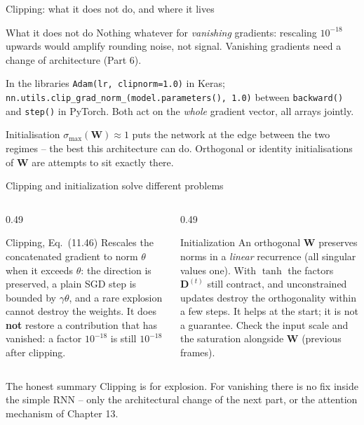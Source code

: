 \documentclass[10pt,aspectratio=169]{beamer}
\begin{document}
\begin{frame}{Clipping: what it does not do, and where it lives}
\begin{block}{What it does not do}
Nothing whatever for \emph{vanishing} gradients: rescaling $10^{-18}$
upwards would amplify rounding noise, not signal.  Vanishing gradients need
a change of architecture (Part 6).
\end{block}
\begin{block}{In the libraries}
\texttt{Adam(lr, clipnorm=1.0)} in Keras;
\texttt{nn.utils.clip\_grad\_norm\_(model.parameters(), 1.0)} between
\texttt{backward()} and \texttt{step()} in PyTorch.  Both act on the
\emph{whole} gradient vector, all arrays jointly.
\end{block}
\begin{block}{Initialisation}
$\sigma_{\max}(\bm{W})\approx1$ puts the network at the edge between the
two regimes -- the best this architecture can do.  Orthogonal or identity
initialisations of $\bm{W}$ are attempts to sit exactly there.
\end{block}
\end{frame}

\begin{frame}{Clipping and initialization solve different problems}
\begin{columns}[T]
\begin{column}{0.49\textwidth}
\begin{block}{Clipping, Eq.~(11.46)}
Rescales the concatenated gradient to norm $\theta$ when it exceeds
$\theta$: the direction is preserved, a plain SGD step is bounded by
$\gamma\theta$, and a rare explosion cannot destroy the weights.  It does
\textbf{not} restore a contribution that has vanished: a factor $10^{-18}$
is still $10^{-18}$ after clipping.
\end{block}
\end{column}
\begin{column}{0.49\textwidth}
\begin{block}{Initialization}
An orthogonal $\bm{W}$ preserves norms in a \emph{linear} recurrence (all
singular values one).  With $\tanh$ the factors $\bm{D}^{(t)}$ still
contract, and unconstrained updates destroy the orthogonality within a few
steps.  It helps at the start; it is not a guarantee.  Check the input scale
and the saturation alongside $\bm{W}$ (previous frames).
\end{block}
\end{column}
\end{columns}
\begin{block}{The honest summary}
Clipping is for explosion.  For vanishing there is no fix inside the simple
RNN -- only the architectural change of the next part, or the attention
mechanism of Chapter 13.
\end{block}
\end{frame}
\end{document}
